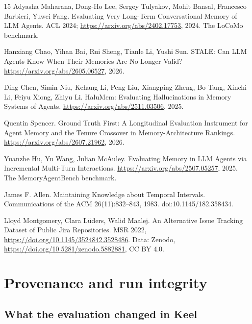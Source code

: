 \documentclass{article}
\begin{document}
\begin{thebibliography}{15}
Adyasha Maharana, Dong-Ho Lee, Sergey Tulyakov, Mohit Bansal, Francesco Barbieri, Yuwei Fang. Evaluating Very Long-Term Conversational Memory of LLM Agents. ACL 2024; \url{https://arxiv.org/abs/2402.17753}, 2024. The LoCoMo benchmark.

Hanxiang Chao, Yihan Bai, Rui Sheng, Tianle Li, Yushi Sun. STALE: Can LLM Agents Know When Their Memories Are No Longer Valid? \url{https://arxiv.org/abs/2605.06527}, 2026.

Ding Chen, Simin Niu, Kehang Li, Peng Liu, Xiangping Zheng, Bo Tang, Xinchi Li, Feiyu Xiong, Zhiyu Li. HaluMem: Evaluating Hallucinations in Memory Systems of Agents. \url{https://arxiv.org/abs/2511.03506}, 2025.

Quentin Spencer. Ground Truth First: A Longitudinal Evaluation Instrument for Agent Memory and the Tenure Crossover in Memory-Architecture Rankings. \url{https://arxiv.org/abs/2607.21962}, 2026.

Yuanzhe Hu, Yu Wang, Julian McAuley. Evaluating Memory in LLM Agents via Incremental Multi-Turn Interactions. \url{https://arxiv.org/abs/2507.05257}, 2025. The MemoryAgentBench benchmark.

James F. Allen. Maintaining Knowledge about Temporal Intervals. Communications of the ACM 26(11):832--843, 1983. doi:10.1145/182.358434.

Lloyd Montgomery, Clara Lüders, Walid Maalej. An Alternative Issue Tracking Dataset of Public Jira Repositories. MSR 2022, \url{https://doi.org/10.1145/3524842.3528486}. Data: Zenodo, \url{https://doi.org/10.5281/zenodo.5882881}, CC BY 4.0.

\end{thebibliography}

\appendix
\renewcommand{\thetable}{\thesection.\arabic{table}}

\section{Provenance and run integrity}
\label{app:provenance}
\setcounter{table}{0}

\subsection{What the evaluation changed in Keel}
\label{app:changes}
\end{document}
